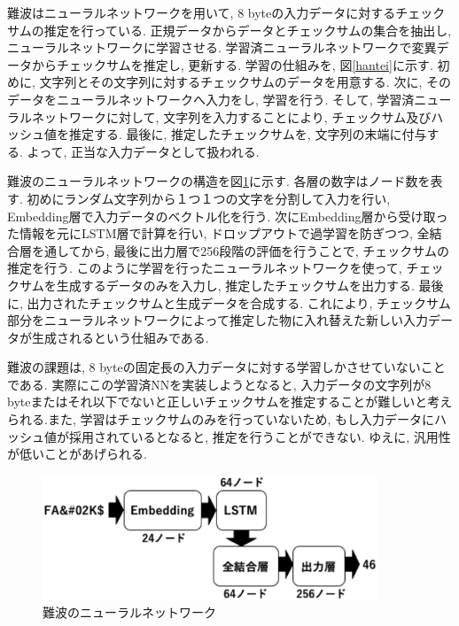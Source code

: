 \documentclass[11pt]{jbook}
\begin{document}
難波\cite{namba}はニューラルネットワークを用いて, 8 byteの入力データに対するチェックサムの推定を行っている.
正規データからデータとチェックサムの集合を抽出し, ニューラルネットワークに学習させる.
学習済ニューラルネットワークで変異データからチェックサムを推定し, 更新する.
学習の仕組みを, 図\ref{hantei}に示す.
初めに, 文字列とその文字列に対するチェックサムのデータを用意する.
次に, そのデータをニューラルネットワークへ入力をし, 学習を行う.
そして, 学習済ニューラルネットワークに対して, 文字列を入力することにより, チェックサム及びハッシュ値を推定する.
最後に, 推定したチェックサムを, 文字列の末端に付与する.
よって, 正当な入力データとして扱われる.

難波\cite{namba}のニューラルネットワークの構造を図\ref{namba}に示す.
各層の数字はノード数を表す.
初めにランダム文字列から１つ１つの文字を分割して入力を行い, Embedding層で入力データのベクトル化を行う.
次にEmbedding層から受け取った情報を元にLSTM層で計算を行い, ドロップアウトで過学習を防ぎつつ,
全結合層を通してから, 最後に出力層で256段階の評価を行うことで, チェックサムの推定を行う.
このように学習を行ったニューラルネットワークを使って, チェックサムを生成するデータのみを入力し, 推定したチェックサムを出力する. 最後に, 出力されたチェックサムと生成データを合成する. これにより, チェックサム部分をニューラルネットワークによって推定した物に入れ替えた新しい入力データが生成されるという仕組みである.

難波\cite{namba}の課題は, 8 byteの固定長の入力データに対する学習しかさせていないことである.
実際にこの学習済NNを実装しようとなると, 入力データの文字列が8 byteまたはそれ以下でないと正しいチェックサムを推定することが難しいと考えられる.また, 学習はチェックサムのみを行っていないため, もし入力データにハッシュ値が採用されているとなると, 推定を行うことができない.
ゆえに, 汎用性が低いことがあげられる.


\begin{figure}[htbp]
\begin{center}
\includegraphics[width=100mm]{Namba_NN.eps}
\caption{難波\cite{namba}のニューラルネットワーク}
\label{namba}
\end{center}
\end{figure}
\end{document}
